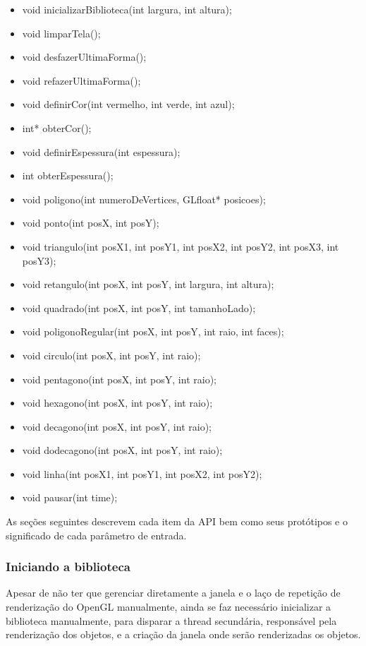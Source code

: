 \documentclass[12pt, %
openright,
oneside, %
a4paper,    %
brazil]{facom-ufu-abntex2}
\begin{document}
\begin{itemize}
    \item void inicializarBiblioteca(int largura, int altura);
    \item void limparTela();
    
    \item void desfazerUltimaForma();
    \item void refazerUltimaForma();
    
    \item void definirCor(int vermelho, int verde, int azul);
    \item int* obterCor();
    
    \item void definirEspessura(int espessura);
    \item int obterEspessura();

    \item void poligono(int numeroDeVertices, GLfloat* posicoes);
    \item void ponto(int posX, int posY);
    \item void triangulo(int posX1, int posY1, int posX2, int posY2, int posX3, int posY3);
    \item void retangulo(int posX, int posY, int largura, int altura);
    \item void quadrado(int posX, int posY, int tamanhoLado);
    \item void poligonoRegular(int posX, int posY, int raio, int faces);
    \item void circulo(int posX, int posY, int raio);
    \item void pentagono(int posX, int posY, int raio);
    \item void hexagono(int posX, int posY, int raio);
    \item void decagono(int posX, int posY, int raio);
    \item void dodecagono(int posX, int posY, int raio);
    \item void linha(int posX1, int posY1, int posX2, int posY2);
    
    \item void pausar(int time);
\end{itemize}

As seções seguintes descrevem cada item da API bem como seus protótipos e o significado de cada parâmetro de entrada.

\subsubsection{Iniciando a biblioteca}
Apesar de não ter que gerenciar diretamente a janela e o laço de repetição de renderização do OpenGL manualmente, ainda se faz necessário inicializar a biblioteca manualmente, para disparar a thread secundária, responsável pela renderização dos objetos, e a criação da janela onde serão renderizadas os objetos.
\end{document}
